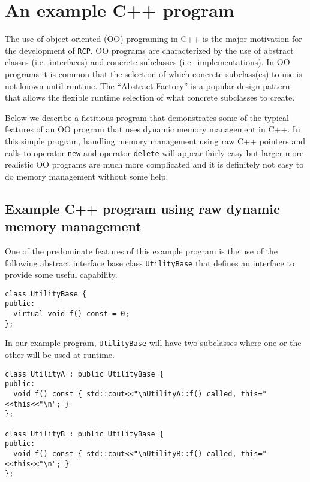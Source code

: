 \documentclass[pdf,ps2pdf,11pt]{SANDreport}
\begin{document}
%
\section{An example C++ program}
%

The use of object-oriented (OO) programing in C++ is the major
motivation for the development of {}\texttt{RCP}.  OO
programs are characterized by the use of abstract classes
(i.e.~interfaces) and concrete subclasses (i.e.~implementations).  In
OO programs it is common that the selection of which concrete
subclass(es) to use is not known until runtime.  The ``Abstract
Factory'' {}\cite{ref:gama_et_al_1995} is a popular design pattern
that allows the flexible runtime selection of what concrete subclasses
to create.

Below we describe a fictitious program that demonstrates some of the
typical features of an OO program that uses dynamic memory management
in C++.  In this simple program, handling memory management using raw
C++ pointers and calls to operator {}\texttt{new} and operator
{}\texttt{delete} will appear fairly easy but larger more realistic OO
programs are much more complicated and it is definitely not easy to do
memory management without some help.

%
\subsection{Example C++ program using raw dynamic memory management}
\label{rcpbg:sec:original-program}
%

One of the predominate features of this example program is the use of
the following abstract interface base class {}\texttt{Utility\-Base}
that defines an interface to provide some useful capability.

{\small\begin{verbatim}
class UtilityBase {
public:
  virtual void f() const = 0;
};
\end{verbatim}}

In our example program, {}\texttt{Utility\-Base} will have two
subclasses where one or the other will be used at runtime.

{\small\begin{verbatim}
class UtilityA : public UtilityBase {
public:
  void f() const { std::cout<<"\nUtilityA::f() called, this="<<this<<"\n"; }
};

class UtilityB : public UtilityBase {
public:
  void f() const { std::cout<<"\nUtilityB::f() called, this="<<this<<"\n"; }
};
\end{verbatim}}
\end{document}
